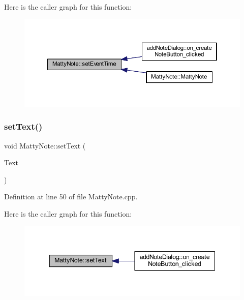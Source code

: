 Here is the caller graph for this function\+:
\nopagebreak
\begin{figure}[H]
\begin{center}
\leavevmode
\includegraphics[width=350pt]{classMattyNote_aaeba8670420ab9ad0fb8be660845e0ba_icgraph}
\end{center}
\end{figure}
\hypertarget{classMattyNote_afa0c4ee32401e4a09e8d04fd0b01da0b}{}\label{classMattyNote_afa0c4ee32401e4a09e8d04fd0b01da0b} 
\subsubsection{\texorpdfstring{set\+Text()}{setText()}}
{\footnotesize\ttfamily void Matty\+Note\+::set\+Text (\begin{DoxyParamCaption}\item[{const Q\+String \&}]{Text }\end{DoxyParamCaption})}



Definition at line 50 of file Matty\+Note.\+cpp.

Here is the caller graph for this function\+:
\nopagebreak
\begin{figure}[H]
\begin{center}
\leavevmode
\includegraphics[width=344pt]{classMattyNote_afa0c4ee32401e4a09e8d04fd0b01da0b_icgraph}
\end{center}
\end{figure}
\hypertarget{classMattyNote_af7909f64608b020b501019cf29796eb0}{}\label{classMattyNote_af7909f64608b020b501019cf29796eb0} 
